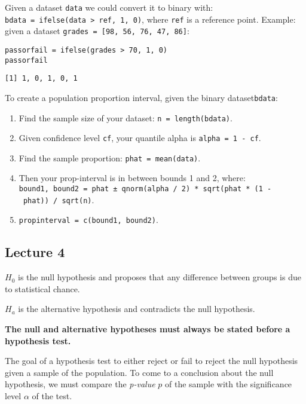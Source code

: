 \hypertarget{section-3}{%
\subsubsection{}\label{section-3}}

Given a dataset \texttt{data} we could convert it to binary with:
\texttt{bdata\ =\ ifelse(data\ \textgreater{}\ ref,\ 1,\ 0)}, where
\texttt{ref} is a reference point. Example: given a dataset
\texttt{grades\ =\ {[}98,\ 56,\ 76,\ 47,\ 86{]}}:

\begin{verbatim}
passorfail = ifelse(grades > 70, 1, 0)
passorfail
\end{verbatim}

\begin{verbatim}
[1] 1, 0, 1, 0, 1
\end{verbatim}

To create a population proportion interval, given the binary
dataset\texttt{bdata}:

\begin{enumerate}
\def\labelenumi{\arabic{enumi}.}
\tightlist
\item
  Find the sample size of your dataset: \texttt{n\ =\ length(bdata)}.
\item
  Given confidence level \texttt{cf}, your quantile alpha is
  \texttt{alpha\ =\ 1\ -\ cf}.
\item
  Find the sample proportion: \texttt{phat\ =\ mean(data)}.
\item
  Then your prop-interval is in between bounds 1 and 2, where:
  \texttt{bound1,\ bound2\ =\ phat\ ±\ qnorm(alpha\ /\ 2)\ *\ sqrt(phat\ *\ (1\ -\ phat))\ /\ sqrt(n)}.
\item
  \texttt{propinterval\ =\ c(bound1,\ bound2)}.
\end{enumerate}

\hypertarget{lecture-4}{%
\subsection{Lecture 4}\label{lecture-4}}

\(H_0\) is the null hypothesis and proposes that any difference between
groups is due to statistical chance.

\(H_a\) is the alternative hypothesis and contradicts the null
hypothesis.

\textbf{The null and alternative hypotheses must always be stated before
a hypothesis test.}

The goal of a hypothesis test to either reject or fail to reject the
null hypothesis given a sample of the population. To come to a
conclusion about the null hypothesis, we must compare the \emph{p-value}
\(p\) of the sample with the significance level \(\alpha\) of the test.

